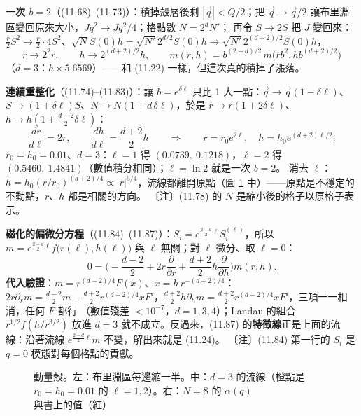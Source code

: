 \textbf{一次 $b=2$}（(11.68)--(11.73)）：積掉殼層後剩 $|\vec q|<Q/2$；把 $\vec q\to\vec q/2$ 讓布里淵區變回原來大小，$Jq^2\to Jq^2/4$；格點數 $N=2^dN'$；
再令 $S\to2S$ 把 $J$ 變回來：$\frac r2S^2\to\frac r2\cdot4S^2$、$\sqrt NS(0)h=\sqrt{N'}2^{d/2}S(0)h\to\sqrt{N'}2^{(d+2)/2}S(0)h$，
\[r\to2^2r,\qquad h\to2^{(d+2)/2}h,\qquad m(r,h)=b^{(2-d)/2}\,m\big(rb^2,hb^{(d+2)/2}\big)\tag{11.71--11.73}\]
（$d=3$：$h\times5.6569$）——和 (11.22) 一樣，但這次真的積掉了漲落。

\textbf{連續重整化}（(11.74)--(11.83)）：讓 $b=e^{\delta\ell}$ 只比 1 大一點：$\vec q\to\vec q(1-\delta\ell)$、$S\to(1+\delta\ell)S$、$N\to N(1+d\,\delta\ell)$，於是 $r\to r(1+2\delta\ell)$、$h\to h(1+\frac{d+2}2\delta\ell)$：
\[\frac{dr}{d\ell}=2r,\qquad\frac{dh}{d\ell}=\frac{d+2}2h\qquad\Rightarrow\qquad r=r_0e^{2\ell},\quad h=h_0e^{(d+2)\ell/2}.\tag{11.82--11.83}\]
$r_0=h_0=0.01$、$d=3$：$\ell=1$ 得 $(0.0739,\ 0.1218)$，$\ell=2$ 得 $(0.5460,\ 1.4841)$（數值積分相同）；$\ell=\ln2$ 就是一次 $b=2$。
消去 $\ell$：$h=h_0(r/r_0)^{(d+2)/4}\propto|r|^{5/4}$，流線都離開原點（圖 \ref{eleven-fig-shell} 中）——原點是不穩定的不動點，$r$、$h$ 都是相關的方向。
〔注〕(11.78) 的 $N$ 是縮小後的格子以原格子表示。

\textbf{磁化的偏微分方程}（(11.84)--(11.87)）：$S_i=e^{\frac{2-d}2\ell}S_i^{(\ell)}$，所以 $m=e^{\frac{2-d}2\ell}f\big(r(\ell),h(\ell)\big)$ 與 $\ell$ 無關；對 $\ell$ 微分、取 $\ell=0$：
\[0=\Big(-\frac{d-2}2+2r\frac{\partial}{\partial r}+\frac{d+2}2h\frac{\partial}{\partial h}\Big)m(r,h).\tag{11.87}\]
\textbf{代入驗證}：$m=r^{(d-2)/4}F(x)$、$x=h\,r^{-(d+2)/4}$：$2r\partial_rm=\frac{d-2}2m-\frac{d+2}2r^{(d-2)/4}xF'$，$\frac{d+2}2h\partial_hm=\frac{d+2}2r^{(d-2)/4}xF'$，三項一一相消，任何 $F$ 都行
（數值殘差 $<10^{-7}$，$d=1,3,4$）；Landau 的組合 $r^{1/2}f(h/r^{3/2})$ 放進 $d=3$ 就不成立。反過來，(11.87) 的\textbf{特徵線}正是上面的流線：沿著流線 $e^{\frac{2-d}2\ell}m$ 不變，解出來就是 (11.24)。
〔注〕(11.84) 第一行的 $S_i$ 是 $q=0$ 模態對每個格點的貢獻。

\begin{figure}[htbp]
\centering
\begin{minipage}[c]{0.25\linewidth}\centering\ElevenFigShell\end{minipage}\hfill
\begin{minipage}[c]{0.38\linewidth}\centering\ElevenFigFlow\end{minipage}\hfill
\begin{minipage}[c]{0.35\linewidth}\centering\footnotesize\setlength{\tabcolsep}{2.5pt}\ElevenTabAlpha\end{minipage}
\caption{動量殼。左：布里淵區每邊縮一半。中：$d=3$ 的流線（橙點是 $r_0=h_0=0.01$ 的 $\ell=1,2$）。右：$N=8$ 的 $\alpha(q)$ 與書上的值（紅）}\label{eleven-fig-shell}
\end{figure}


